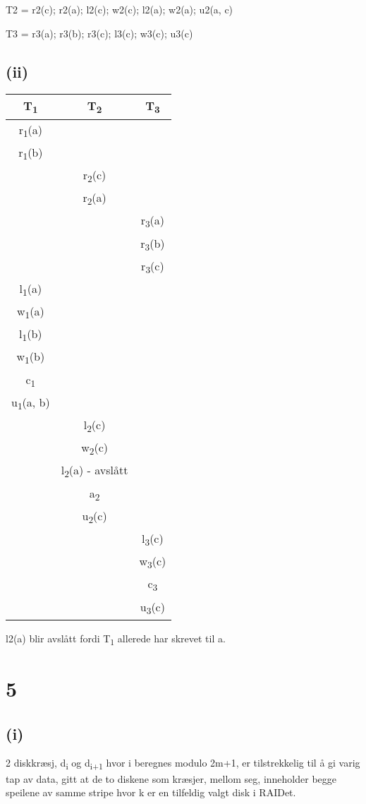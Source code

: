 \documentclass[12pt,norsk,a4paper]{article}
\begin{document}
T2 = r2(c); r2(a); l2(c); w2(c); l2(a); w2(a); u2(a, c)

T3 = r3(a); r3(b); r3(c); l3(c); w3(c); u3(c)

\subsection*{(ii)}
\begin{tabular}{c | c | c}
T\textsubscript{1} & T\textsubscript{2} & T\textsubscript{3} \\
\hline
r\textsubscript{1}(a) & & \\
r\textsubscript{1}(b) & & \\
& r\textsubscript{2}(c) & \\
& r\textsubscript{2}(a) & \\
& & r\textsubscript{3}(a)\\
& & r\textsubscript{3}(b)\\
& & r\textsubscript{3}(c)\\
l\textsubscript{1}(a)& & \\
w\textsubscript{1}(a)& & \\
l\textsubscript{1}(b)& & \\
w\textsubscript{1}(b)& & \\
c\textsubscript{1} & & \\
u\textsubscript{1}(a, b)&  & \\
& l\textsubscript{2}(c) & \\
& w\textsubscript{2}(c) & \\
& l\textsubscript{2}(a) - avslått & \\
& a\textsubscript{2} & \\
& u\textsubscript{2}(c) & \\
& & l\textsubscript{3}(c)\\
& & w\textsubscript{3}(c)\\
& & c\textsubscript{3}\\
& & u\textsubscript{3}(c)\\
\end{tabular}

l2(a) blir avslått fordi T\textsubscript{1} allerede har skrevet til a.

\section*{5}
\subsection*{(i)}
2 diskkræsj, d\textsubscript{i} og d\textsubscript{i+1} hvor i beregnes modulo 2m+1, er tilstrekkelig til å gi varig tap av data, gitt at de to diskene som kræsjer, mellom seg, inneholder begge speilene av samme stripe  hvor k er en tilfeldig valgt disk i RAIDet.
\end{document}
